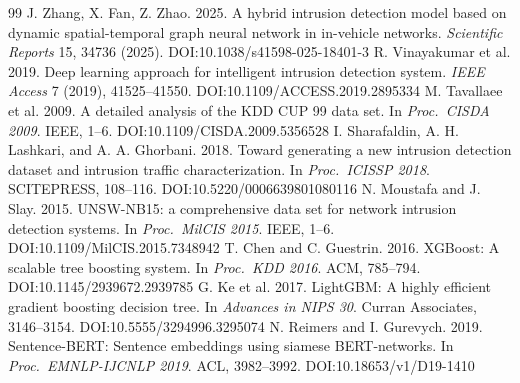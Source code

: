\documentclass[sigconf,authordraft]{acmart}
\begin{document}
\begin{thebibliography}{99}
 J. Zhang, X. Fan, Z. Zhao. 2025. A hybrid intrusion detection model based on dynamic spatial-temporal graph neural network in in-vehicle networks. \textit{Scientific Reports} 15, 34736 (2025). DOI:10.1038/s41598-025-18401-3
 R. Vinayakumar et al. 2019. Deep learning approach for intelligent intrusion detection system. \textit{IEEE Access} 7 (2019), 41525--41550. DOI:10.1109/ACCESS.2019.2895334
 M. Tavallaee et al. 2009. A detailed analysis of the KDD CUP 99 data set. In \textit{Proc.\ CISDA 2009}. IEEE, 1--6. DOI:10.1109/CISDA.2009.5356528
 I. Sharafaldin, A. H. Lashkari, and A. A. Ghorbani. 2018. Toward generating a new intrusion detection dataset and intrusion traffic characterization. In \textit{Proc.\ ICISSP 2018}. SCITEPRESS, 108--116. DOI:10.5220/0006639801080116
 N. Moustafa and J. Slay. 2015. UNSW-NB15: a comprehensive data set for network intrusion detection systems. In \textit{Proc.\ MilCIS 2015}. IEEE, 1--6. DOI:10.1109/MilCIS.2015.7348942
 T. Chen and C. Guestrin. 2016. XGBoost: A scalable tree boosting system. In \textit{Proc.\ KDD 2016}. ACM, 785--794. DOI:10.1145/2939672.2939785
 G. Ke et al. 2017. LightGBM: A highly efficient gradient boosting decision tree. In \textit{Advances in NIPS 30}. Curran Associates, 3146--3154. DOI:10.5555/3294996.3295074
 N. Reimers and I. Gurevych. 2019. Sentence-BERT: Sentence embeddings using siamese BERT-networks. In \textit{Proc.\ EMNLP-IJCNLP 2019}. ACL, 3982--3992. DOI:10.18653/v1/D19-1410
\end{thebibliography}
\end{document}
